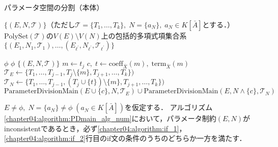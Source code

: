 \begin{algorithm}[htbp]
	\caption{パラメータ空間の分割（本体）}
	\label{chapter04:algorithm:PDmain_alg_num}
	\begin{algorithmic}[1]

		\Require $\{ (E, N, \mathscr{T}) \}$（ただし$\mathscr{T} = \{ T_1, \dots, T_k \}, \; N = \{ a_N \}, \; a_N \in K[\bar{A}]$とする．）
		\Ensure $\mathrm{PolySet}(\mathscr{T})$の$V(E) \setminus V(N)$上の包括的多項式項集合系$\{ (E_1, N_1, \mathscr{T}_1), \dots, (E_{\ell^\prime}, N_{\ell^\prime}, \mathscr{T}_{\ell^\prime})\}$

		 \label{chapter04:algorithm:if_1}
			\State \Return $\phi$
		\EndIf
		 \label{chapter04:algorithm:if_2}
			\State \Return $\phi$
		\EndIf
		 \label{chapter04:algorithm:if_3}
			\State \Return $\{ (E, N,\mathscr{T}) \}$
		\EndIf
		 \label{chapter04:algorithm:if_4}
			\State $m \gets t_j$
			\State $c, \; t \gets \mathrm{coeff}_{\bar{X}}(m), \; \mathrm{term}_{\bar{X}}(m)$
		\EndIf
		\State $\mathscr{T}_E \gets \{ T_1, \dots, T_{j-1}, T_j \setminus \{ m \}, T_{j+1}, \dots, T_k \})$ \label{chapter04:algorithm:TE}
		\State $\mathscr{T}_N \gets \{ T_1, \dots, T_{j-1}, (T_j \cup \{ t \}) \setminus \{ m \}, T_{j+1}, \dots, T_k \})$ \label{chapter04:algorithm:TN}
		\State \Return $\mathrm{ParameterDivisionMain}(E \cup \{ c \}, N, \mathscr{T}_E) \cup \mathrm{ParameterDivisionMain}(E, N \land \{ c \}, \mathscr{T}_N)$ \label{chapter04:algorithm:return}
		\EndFunction
	\end{algorithmic}
\end{algorithm}

\begin{lemma}
	\label{chapter04:lemma:for_alg_3}
	$E \ne \phi,\; N = \{a_N\} \ne \phi \;(a_N \in K[\bar{A}])$を仮定する．
	アルゴリズム \ref{chapter04:algorithm:PDmain_alg_num}において，パラメータ制約$(E, N)$がinconsistentであるとき，必ず\ref{chapter04:algorithm:if_1}，\ref{chapter04:algorithm:if_2}行目のif文の条件のうちのどちらか一方を満たす．
\end{lemma}

